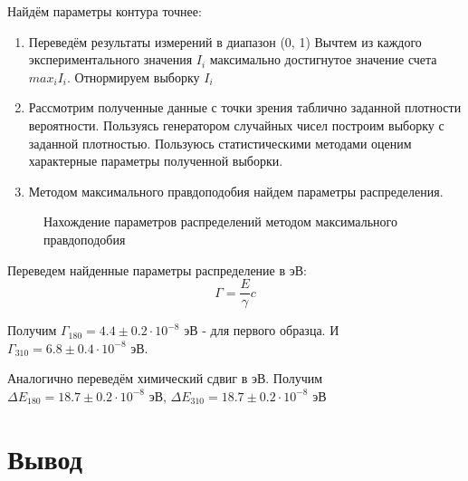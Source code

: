 \documentclass[a4paper, 14pt]{article}
\begin{document}
Найдём параметры контура точнее:
\begin{enumerate}
    \item Переведём результаты измерений в диапазон (0, 1)
          \subitem Вычтем из каждого экспериментального значения $I_{i}$ максимально достигнутое значение счета $max_{i} I_{i}$.
          \subitem Отнормируем выборку $I_{i}$
    \item Рассмотрим полученные данные с точки зрения таблично заданной плотности вероятности. Пользуясь генератором случайных чисел построим выборку с заданной плотностью. Пользуюсь статистическими методами
          оценим характерные параметры полученной выборки.
    \item Методом максимального правдоподобия найдем параметры распределения. 
\end{enumerate}
\begin{figure}[h]
    
    \caption{Нахождение параметров распределений методом максимального правдоподобия}
\end{figure}

Переведем найденные параметры распределение в $\text{эВ}$:
\begin{equation}
    \Gamma = \frac{E}{\gamma}{c} 
\end{equation}

Получим $\Gamma_{180} = 4.4 \pm 0.2 \cdot 10^{-8}  \text{ эВ}$ - 
для первого образца. И $\Gamma_{310} =  6.8 \pm 0.4 \cdot 10^{-8} \text{ эВ}$.

Аналогично переведём химический сдвиг в $ \text{эВ}$. Получим $\Delta E_{180} = 18.7 \pm 0.2 \cdot 10^{-8} \text{ эВ}$,
$\Delta E_{310} = 18.7 \pm 0.2 \cdot 10^{-8} \text{ эВ}$



\section*{\textcolor{header}{Вывод}}
\end{document}

